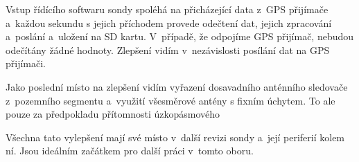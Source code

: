 \documentclass[twoside]{ctuthesis}
\theoremstyle{plain}
\theoremstyle{definition}
\theoremstyle{note}
\begin{document}
	Vstup řídícího softwaru sondy spoléhá na přicházející data z~GPS přijímače a~každou sekundu s jejich příchodem provede odečtení dat, jejich zpracování a~poslání a~uložení na SD kartu. V~případě, že odpojíme GPS přijímač, nebudou odečítány žádné hodnoty. Zlepšení vidím v~nezávislosti posílání dat na GPS přijímači.

	Jako poslední místo na zlepšení vidím vyřazení dosavadního anténního sledovače z~pozemního segmentu a~využití všesměrové antény s fixním úchytem. To ale pouze za předpokladu přítomnosti úzkopásmového 

	Všechna tato vylepšení mají své místo v~další revizi sondy a~její periferií kolem ní. Jsou ideálním začátkem pro další práci v~tomto oboru.
	
















	


\appendix

\printindex
\end{document}
